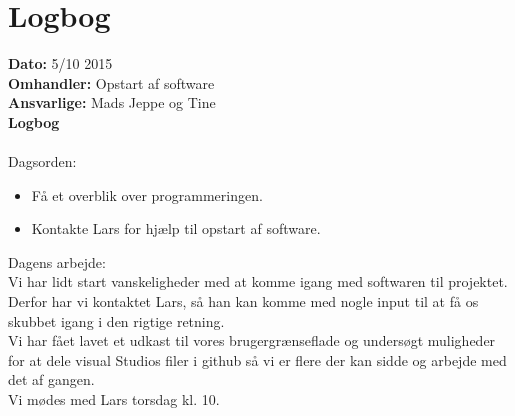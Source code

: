 \section{Logbog}

\textbf{Dato:} 5/10 2015 \\
\textbf{Omhandler:} Opstart af software\\ 
\textbf{Ansvarlige:} Mads Jeppe og Tine\\
\textbf{Logbog}
\\
\\
Dagsorden:
\begin{itemize}
	\item Få et overblik over programmeringen.\\
	\item Kontakte Lars for hjælp til opstart af software.\\  
\end{itemize}

Dagens arbejde: \\
Vi har lidt start vanskeligheder med at komme igang med softwaren til projektet. Derfor har vi kontaktet Lars, så han kan komme med nogle input til at få os skubbet igang i den rigtige retning. \\
Vi har fået lavet et udkast til vores brugergrænseflade og undersøgt muligheder for at dele visual Studios filer i github så vi er flere der kan sidde og arbejde med det af gangen.\\
Vi mødes med Lars torsdag kl. 10.\\



